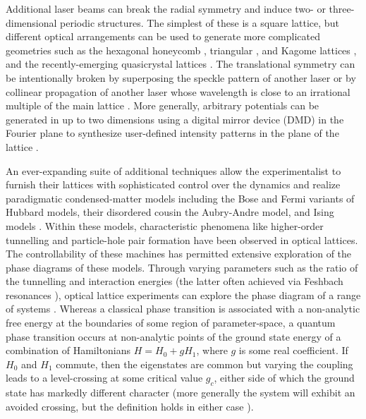 	Additional laser beams can break the radial symmetry and induce two- or three-dimensional periodic structures.
	The simplest of these is a square lattice, but different optical arrangements can be used to generate more complicated geometries such as the hexagonal honeycomb \cite{Jotzu14},  triangular \cite{Becker10}, and Kagome lattices \cite{Jo12}, and the recently-emerging quasicrystal lattices \cite{Viebahn19}.
	The translational symmetry can be intentionally broken by superposing the speckle pattern of another laser \cite{Pasienski10} or by collinear propagation of another laser whose wavelength is close to an irrational multiple of the main lattice \cite{Rispoli19}.
	More generally, arbitrary potentials can be generated in up to two dimensions using a digital mirror device (DMD) in the Fourier plane to synthesize user-defined intensity patterns in the plane of the lattice \cite{Gross17}.
	
	
	An ever-expanding suite of additional techniques allow the experimentalist to furnish their lattices with sophisticated control over the dynamics and realize paradigmatic condensed-matter models including the Bose \cite{Greiner01,Miranda15,Rispoli19,Sherson10,Preiss15a} and Fermi \cite{Bakr09,Cheuk15,Haller15,Chiu18} variants of Hubbard models, their disordered cousin the Aubry-Andre \cite{Rispoli19} model, and Ising models \cite{Simon11}.
	Within these models, characteristic phenomena like higher-order tunnelling \cite{Folling07} and particle-hole pair formation \cite{Endres11} have been observed in optical lattices.
	The controllability of these machines has permitted extensive exploration of the phase diagrams of these models.
	Through varying parameters such as the ratio of the tunnelling and interaction energies (the latter often achieved via Feshbach resonances \cite{Chin10}), optical lattice experiments can explore the phase diagram of a range of systems \cite{Greiner01,Eckardt05,Jordens08,Jo09,Haller10,Simon11,Baumann10,Leonard17,Landig16,SachdevQPT,Endres12,Anquez16,Clark16}.
	Whereas a classical phase transition is associated with a non-analytic free energy at the boundaries of some region of parameter-space, a quantum phase transition occurs at non-analytic points of the ground state energy of a combination of Hamiltonians $H = H_0 + g H_1$, where $g$ is some real coefficient.
	\cite{SachdevQPT}
	If $H_0$ and $H_1$ commute, then the eigenstates are common but varying the coupling leads to a level-crossing at some critical value $g_c$, either side of which the ground state has markedly different character (more generally the system will exhibit an avoided crossing, but the definition holds in either case \cite{SachdevQPT}).
	
